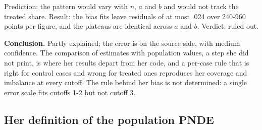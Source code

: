 \begin{description}[leftmargin=1em,style=nextline]
\item[Monte Carlo noise (neither).] Prediction: the pattern would vary with $n$, $a$ and $b$ and would not track the treated share. Result: the bias fits leave residuals of at most .024 over 240-960 points per figure, and the plateaus are identical across $a$ and $b$. Verdict: ruled out.
\end{description}
\textbf{Conclusion.} Partly explained; the error is on the source side, with medium confidence. The comparison of estimates with population values, a step she did not print, is where her results depart from her code, and a per-case rule that is right for control cases and wrong for treated ones reproduces her coverage and imbalance at every cutoff. The rule behind her bias is not determined: a single error scale fits cutoffs 1-2 but not cutoff 3.

\subsection{Her definition of the population PNDE}\label{dis:pnde-definition}

